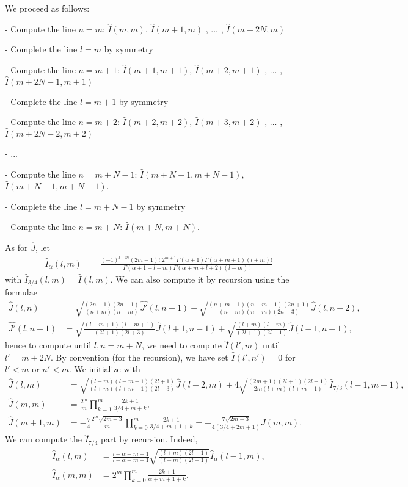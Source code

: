 \documentclass[11pt]{article}
\newcommand{\hI}{\widehat{I}}
\newcommand{\hJ}{\widehat{J}}
\newcommand{\hJp}{\widehat{J'}}
\begin{document}
We proceed as follows:

- Compute the line $n=m$: $\hI(m,m)$, $\hI(m+1,m)$ , ... , $\hI(m+2N,m)$

- Complete the line $l=m$ by symmetry

- Compute the line $n=m+1$: $\hI(m+1,m+1)$, $\hI(m+2,m+1)$ , ... , $\hI(m+2N-1,m+1)$

- Complete the line $l=m+1$ by symmetry

- Compute the line $n=m+2$: $\hI(m+2,m+2)$, $\hI(m+3,m+2)$ , ... , $\hI(m+2N-2,m+2)$

- ...

- Compute the line $n=m+N-1$: $\hI(m+N-1,m+N-1)$, $\hI(m+N+1,m+N-1)$.

- Complete the line $l=m+N-1$ by symmetry

- Compute the line $n=m+N$: $\hI(m+N,m+N)$.

As for $\hJ$, let
\begin{align}
\hI_{\alpha}(l,m) &= \frac{(-1)^{l-m}(2m-1)!!2^{m+1}\Gamma(\alpha+1)\Gamma(\alpha+m+1)(l+m)!}{\Gamma(\alpha+1-l+m)\Gamma(\alpha+m+l+2)(l-m)!} 
\end{align}
with $\hI_{3/4}(l,m) =\hI(l,m)$. We can also compute it by recursion using the formulae
\begin{align*}
\hJ(l,n) &= \sqrt{\frac{(2n+1)(2n-1)}{(n+m)(n-m)}} \hJp(l,n-1)+\sqrt{\frac{(n+m-1)(n-m-1)(2n+1)}{(n+m)(n-m)(2n-3)}} \hJ(l,n-2) ,\\
\hJp(l,n-1) &= \sqrt{\frac{(l+m+1)(l-m+1)}{(2l+1)(2l+3)}} \hJ(l+1,n-1)+\sqrt{\frac{(l+m)(l-m)}{(2l+1)(2l-1)}} \hJ(l-1,n-1) ,
\end{align*}
hence to compute until $l,n=m+N$, we need to compute $\hI(l',m)$ until $l'=m+2N$. By convention (for the recursion), we have set $\hI(l',n')=0$ for $l'<m$ or  $n'<m$.
We initialize with
\begin{align*}
\hJ(l,m) &=\sqrt{\frac{(l-m)(l-m-1)(2l+1)}{(l+m)(l+m-1)(2l-3)}} \hJ(l-2,m)+ 4 \sqrt{\frac{(2m+1)(2l+1)(2l-1)}{2m(l+m)(l+m-1)}} \hI_{7/3}(l-1,m-1) ,\\
\hJ(m,m) &= \frac{2^m}{m} \prod_{k=1}^{m} \frac{2k+1}{3/4 + m + k} ,\\
\hJ(m+1,m) &= -\frac{7}{4}\frac{2^m\sqrt{2m+3}}{m} \prod_{k=0}^{m} \frac{2k+1}{3/4 + m + 1 +k} = -\frac{7\sqrt{2m+3}}{4(3/4+2m+1)} \hJ(m,m).
\end{align*}
We can compute the $\hI_{7/4}$ part by recursion. Indeed,
\begin{align}
\hI_{\alpha}(l,m) &= \frac{l-\alpha-m-1}{l+\alpha+m+1} \sqrt{\frac{(l+m)(2l+1)}{(l-m)(2l-1)}} \hI_{\alpha}(l-1,m) ,\\
\hI_{\alpha}(m,m) &= 2^m \prod_{k=0}^{m} \frac{2k+1}{\alpha + m + 1 + k} .
\end{align}
\end{document}
